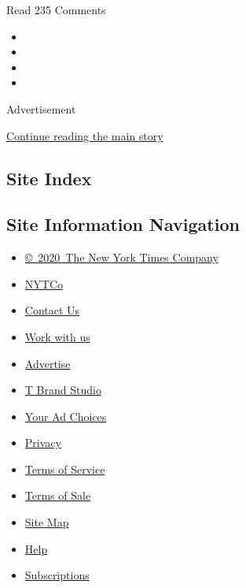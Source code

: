 Read 235 Comments

\begin{itemize}
\item
\item
\item
\item
\end{itemize}

Advertisement

\protect\hyperlink{after-bottom}{Continue reading the main story}

\hypertarget{site-index}{%
\subsection{Site Index}\label{site-index}}

\hypertarget{site-information-navigation}{%
\subsection{Site Information
Navigation}\label{site-information-navigation}}

\begin{itemize}
\tightlist
\item
  \href{https://help.nytimes.com/hc/en-us/articles/115014792127-Copyright-notice}{©~2020~The
  New York Times Company}
\end{itemize}

\begin{itemize}
\tightlist
\item
  \href{https://www.nytco.com/}{NYTCo}
\item
  \href{https://help.nytimes.com/hc/en-us/articles/115015385887-Contact-Us}{Contact
  Us}
\item
  \href{https://www.nytco.com/careers/}{Work with us}
\item
  \href{https://nytmediakit.com/}{Advertise}
\item
  \href{http://www.tbrandstudio.com/}{T Brand Studio}
\item
  \href{https://www.nytimes.com/privacy/cookie-policy\#how-do-i-manage-trackers}{Your
  Ad Choices}
\item
  \href{https://www.nytimes.com/privacy}{Privacy}
\item
  \href{https://help.nytimes.com/hc/en-us/articles/115014893428-Terms-of-service}{Terms
  of Service}
\item
  \href{https://help.nytimes.com/hc/en-us/articles/115014893968-Terms-of-sale}{Terms
  of Sale}
\item
  \href{https://spiderbites.nytimes.com}{Site Map}
\item
  \href{https://help.nytimes.com/hc/en-us}{Help}
\item
  \href{https://www.nytimes.com/subscription?campaignId=37WXW}{Subscriptions}
\end{itemize}
